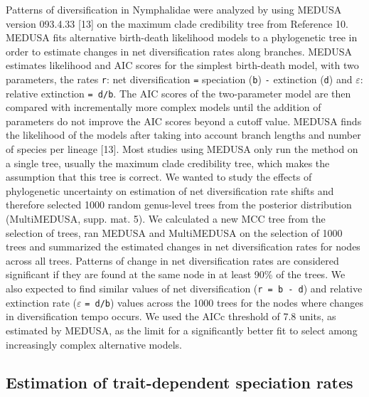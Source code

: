 \documentclass[10pt]{article}
\begin{document}
Patterns of diversification in Nymphalidae were analyzed by using MEDUSA
version 093.4.33 {[}13{]} on the maximum clade credibility tree from
Reference 10. MEDUSA fits alternative birth-death likelihood models to a
phylogenetic tree in order to estimate changes in net diversification
rates along branches. MEDUSA estimates likelihood and AIC scores for the
simplest birth-death model, with two parameters, the rates \texttt{r}:
net diversification \texttt{=} speciation (\texttt{b}) \texttt{-}
extinction (\texttt{d}) and $\varepsilon$: relative extinction
\texttt{= d/b}. The AIC scores of the two-parameter model are then
compared with incrementally more complex models until the addition of
parameters do not improve the AIC scores beyond a cutoff value. MEDUSA
finds the likelihood of the models after taking into account branch
lengths and number of species per lineage {[}13{]}. Most studies using
MEDUSA only run the method on a single tree, usually the maximum clade
credibility tree, which makes the assumption that this tree is correct.
We wanted to study the effects of phylogenetic uncertainty on estimation
of net diversification rate shifts and therefore selected 1000 random
genus-level trees from the posterior distribution (MultiMEDUSA, supp.
mat. 5). We calculated a new MCC tree from the selection of trees, ran
MEDUSA and MultiMEDUSA on the selection of 1000 trees and summarized the
estimated changes in net diversification rates for nodes across all
trees. Patterns of change in net diversification rates are considered
significant if they are found at the same node in at least 90\% of the
trees. We also expected to find similar values of net diversification
(\texttt{r = b - d}) and relative extinction rate ($\varepsilon$
\texttt{= d/b}) values across the 1000 trees for the nodes where changes
in diversification tempo occurs. We used the AICc threshold of 7.8
units, as estimated by MEDUSA, as the limit for a significantly better
fit to select among increasingly complex alternative models.

\subsection*{Estimation of trait-dependent speciation rates}
\end{document}
